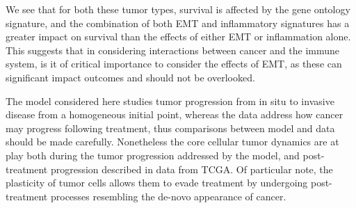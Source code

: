 \documentclass[11pt]{article}
\begin{document}
We see that for both these tumor types, survival is affected by the gene ontology signature, and the combination of both EMT and inflammatory signatures has a greater impact on survival than the effects of either EMT or inflammation alone.
This suggests that in considering interactions between cancer and the immune system, is it of critical importance to consider the effects of EMT, as these can significant impact outcomes and should not be overlooked. 
\par
The model considered here studies tumor progression from in situ to invasive disease from a homogeneous initial point, whereas the data address how cancer may progress following treatment, thus comparisons between model and data should be made carefully. Nonetheless the core cellular tumor dynamics are at play
 both during the tumor progression addressed by the model, and post-treatment progression described in data from TCGA. Of particular note, the plasticity of tumor cells allows them to evade treatment by undergoing post-treatment processes resembling the de-novo appearance of cancer\cite{sanchez2018slow}.
\end{document}
